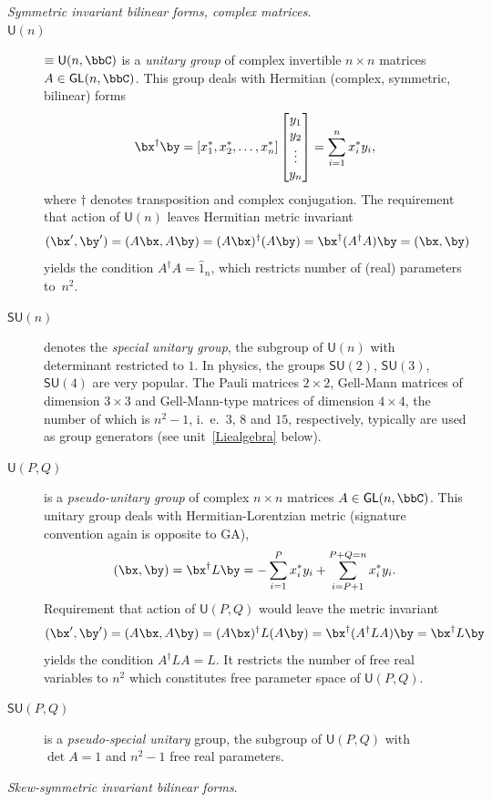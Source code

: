 \begin{unit}
\begin{description}
\item[{\it Symmetric invariant bilinear forms, complex matrices}.]
\item[$\mathsf{U}(n)$] $\equiv\mathsf{U}(n,\bbC)$ is a
\textit{unitary group} of complex invertible $n\times n$ matrices
$A\in \mathsf{GL}(n,\bbC)$. This group deals with Hermitian
(complex, symmetric, bilinear) forms
\[
\bx^{\dagger}\by=[x_1^*,x_2^*,\ldots,
x_n^*]\begin{bmatrix}y_1\\y_2\\\vdots\\y_n\end{bmatrix}=\sum_{i=1}^n
x_i^* y_i,
\]
where $\dagger$ denotes transposition and complex conjugation.
The requirement that action of $\mathsf{U}(n)$ leaves Hermitian metric invariant
\[(\bx^\prime,\by^\prime)=(A\bx,A\by)=(A\bx)^{\dagger}(A\by)
=\bx^{\dagger}(A^{\dagger}A)\by=(\bx,\by)\] yields the condition
$A^{\dagger} A = \hat{1}_n$, which restricts number of (real)
parameters to~$n^2$.
%
\item[$\mathsf{SU}(n)$] denotes the \textit{special unitary
group}, the subgroup of $\mathsf{U}(n)$ with determinant
restricted to $1$. In physics, the groups $\mathsf{SU}(2)$,
$\mathsf{SU}(3)$, $\mathsf{SU}(4)$ are very popular. The Pauli
matrices  $2\times 2$, Gell-Mann matrices of dimension $3\times 3$
and Gell-Mann-type matrices of dimension $4\times 4$, the number
of which is $n^2-1$, i.~e.~$3$, $8$ and $15$, respectively,
typically are used as group generators (see unit~\ref{Liealgebra}
below).
%
\item[$\mathsf{U}(P,Q)$] is a \textit{pseudo-unitary group} of
complex $n\times n$ matrices $A\in \mathsf{GL}(n,\bbC)$. This
unitary group deals with Hermitian-Lorentzian metric (signature
convention again is opposite to GA),
\[
(\bx,\by)= \bx^{\dagger}L\by= -\sum_{i=1}^P x_i^* y_i
+\sum_{i=P+1}^{P+Q=n} x_i^* y_i.
\]
Requirement that action of $\mathsf{U}(P,Q)$ would leave the metric invariant
\[(\bx^\prime,\by^\prime)=(A\bx,A\by)=(A\bx)^{\dagger}L (A\by)=
\bx^{\dagger}(A^{\dagger}L A)\by=\bx^{\dagger} L\by\]
yields the condition $A^{\dagger}L A = L$. It restricts the number of free real
variables to $n^2$ which constitutes free parameter space of $\mathsf{U}(P,Q)$.
%
\item[$\mathsf{SU}(P,Q)$] is a \textit{pseudo-special unitary} group,
 the subgroup of $\mathsf{U}(P,Q)$ with $\det A =1$ and $n^2-1$ free real parameters.
 \\[3pt]
\item[{\it Skew-symmetric invariant bilinear forms}.]

\end{description}
\end{unit}

